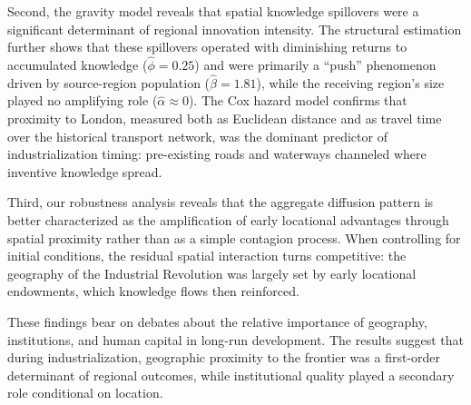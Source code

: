 \documentclass[letterpaper,12pt,leqno]{article}
\begin{document}
Second, the gravity model reveals that spatial knowledge spillovers were a significant determinant of regional innovation intensity. The structural estimation further shows that these spillovers operated with diminishing returns to accumulated knowledge (\(\hat{\phi} = 0.25\)) and were primarily a ``push'' phenomenon driven by source-region population (\(\hat{\beta} = 1.81\)), while the receiving region's size played no amplifying role (\(\hat{\alpha} \approx 0\)). The Cox hazard model confirms that proximity to London, measured both as Euclidean distance and as travel time over the historical transport network, was the dominant predictor of industrialization timing: pre-existing roads and waterways channeled where inventive knowledge spread.

Third, our robustness analysis reveals that the aggregate diffusion pattern is better characterized as the amplification of early locational advantages through spatial proximity rather than as a simple contagion process. When controlling for initial conditions, the residual spatial interaction turns competitive: the geography of the Industrial Revolution was largely set by early locational endowments, which knowledge flows then reinforced.

These findings bear on debates about the relative importance of geography, institutions, and human capital in long-run development. The results suggest that during industrialization, geographic proximity to the frontier was a first-order determinant of regional outcomes, while institutional quality played a secondary role conditional on location.

\clearpage


\end{document}
